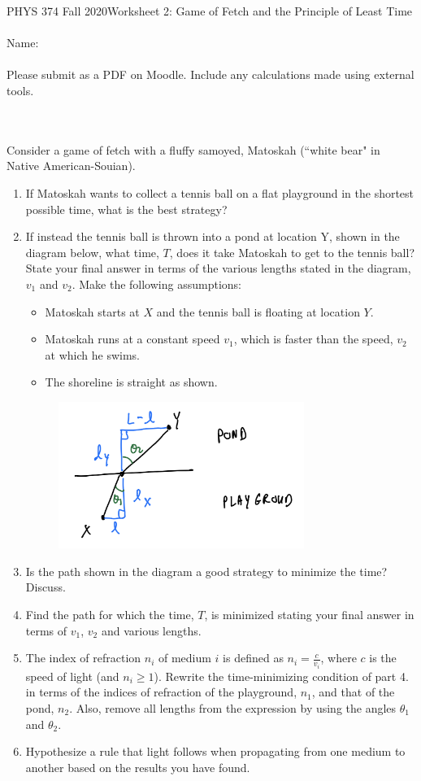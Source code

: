 \documentclass[12pt]{article}
\begin{document}
PHYS 374 Fall 2020\hfill Worksheet 2: Game of Fetch and the Principle of Least Time\\
\\
Name: \\
\\
Please submit as a PDF on Moodle. Include any calculations made using external tools.

\hrulefill
\\
\\
\noindent
Consider a game of fetch with a fluffy samoyed, Matoskah (``white bear" in Native American-Souian).
\begin{enumerate}
\item If Matoskah wants to collect a tennis ball on a flat playground in the shortest possible time, what is the best strategy?
\item If instead the tennis ball is thrown into a pond at location Y, shown in the diagram below, what time, $T$, does it take Matoskah to get to the tennis ball? State your final answer in terms of the various lengths stated in the diagram, $v_{1}$ and $v_{2}$. Make the following assumptions:
\begin{itemize}
\item Matoskah starts at $X$ and the tennis ball is floating at location $Y$.
\item Matoskah runs at a constant speed $v_{1}$, which is faster than the speed, $v_{2}$ at which he swims.
\item The shoreline is straight as shown.
\end{itemize}
\begin{figure}[h]
\includegraphics[width=8cm]{Diagram}
\centering
\end{figure}
\item Is the path shown in the diagram a good strategy to minimize the time? Discuss.
\item Find the path for which the time, $T$, is minimized stating your final answer in terms of $v_{1}$, $v_{2}$ and various lengths.
\item The index of refraction $n_{i}$ of medium $i$ is defined as $n_{i}=\frac{c}{v_{i}}$, where $c$ is the speed of light (and $n_{i}\ge 1$). Rewrite the time-minimizing condition of part 4. in terms of the indices of refraction of the playground, $n_{1}$, and that of the pond, $n_{2}$. Also, remove all lengths from the expression by using the angles $\theta_{1}$ and $\theta_{2}$.
\item Hypothesize a rule that light follows when propagating from one medium to another based on the results you have found.
\end{enumerate}
\end{document}
